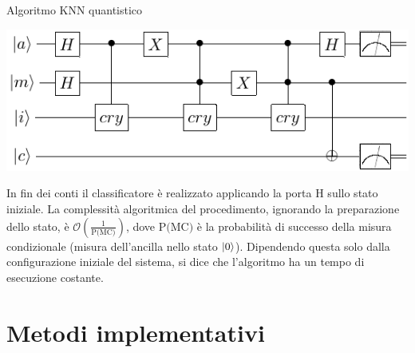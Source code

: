 \documentclass{beamer}
\begin{document}
    \begin{frame}{Algoritmo KNN quantistico}
        \begin{center}
            \includegraphics[width=.8\textwidth]{gfx/qknn.pdf}            
        \end{center}

        In fin dei conti il classificatore è realizzato applicando la porta H sullo stato iniziale. 
        La complessità algoritmica del procedimento, ignorando la preparazione dello 
        stato, è $\mathcal{O}\left(\frac{1}{\text{P(MC)}}\right)$, 
        dove $\text{P(MC)}$ è la probabilità di successo della misura condizionale 
        (misura dell'ancilla nello stato $\ket{0}$). 
        Dipendendo questa solo dalla configurazione iniziale del sistema, si 
        dice che l'algoritmo ha un tempo di esecuzione costante. \cite{fingerhuth}
    \end{frame}

    \section{Metodi implementativi}
\end{document}
